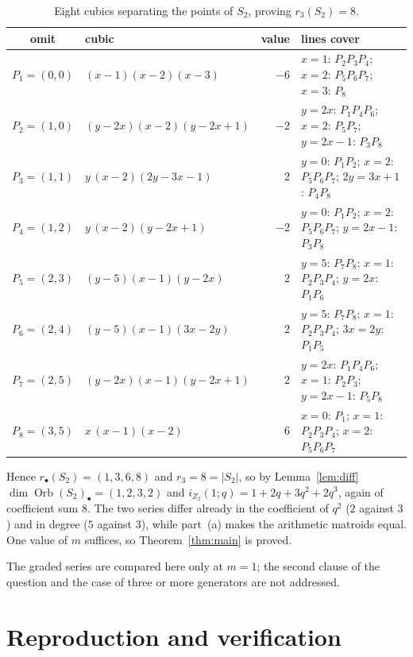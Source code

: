 \documentclass[11pt]{amsart}
\theoremstyle{definition}
\newcommand{\Orb}{\operatorname{Orb}}
\newcommand{\Ztwo}{Z_2}
\begin{document}
\begin{table}[htbp]
\small
\renewcommand{\arraystretch}{1.2}
\begin{tabular}{@{}clr>{\raggedright\arraybackslash}p{}@{}}
\hline
omit & cubic & value & lines cover\\
\hline
$P_1=(0,0)$ & $(x-1)(x-2)(x-3)$ & $-6$ & $x{=}1$: $P_2P_3P_4$; $x{=}2$: $P_5P_6P_7$; $x{=}3$: $P_8$\\
$P_2=(1,0)$ & $(y-2x)(x-2)(y-2x+1)$ & $-2$ & $y{=}2x$: $P_1P_4P_6$; $x{=}2$: $P_5P_7$; $y{=}2x{-}1$: $P_3P_8$\\
$P_3=(1,1)$ & $y\,(x-2)(2y-3x-1)$ & $2$ & $y{=}0$: $P_1P_2$; $x{=}2$: $P_5P_6P_7$; $2y{=}3x{+}1$: $P_4P_8$\\
$P_4=(1,2)$ & $y\,(x-2)(y-2x+1)$ & $-2$ & $y{=}0$: $P_1P_2$; $x{=}2$: $P_5P_6P_7$; $y{=}2x{-}1$: $P_3P_8$\\
$P_5=(2,3)$ & $(y-5)(x-1)(y-2x)$ & $2$ & $y{=}5$: $P_7P_8$; $x{=}1$: $P_2P_3P_4$; $y{=}2x$: $P_1P_6$\\
$P_6=(2,4)$ & $(y-5)(x-1)(3x-2y)$ & $2$ & $y{=}5$: $P_7P_8$; $x{=}1$: $P_2P_3P_4$; $3x{=}2y$: $P_1P_5$\\
$P_7=(2,5)$ & $(y-2x)(x-1)(y-2x+1)$ & $2$ & $y{=}2x$: $P_1P_4P_6$; $x{=}1$: $P_2P_3$; $y{=}2x{-}1$: $P_5P_8$\\
$P_8=(3,5)$ & $x\,(x-1)(x-2)$ & $6$ & $x{=}0$: $P_1$; $x{=}1$: $P_2P_3P_4$; $x{=}2$: $P_5P_6P_7$\\
\hline
\end{tabular}
\medskip
\caption{Eight cubics separating the points of $S_2$, proving $r_3(S_2)=8$.}
\label{tab:cubics}
\end{table}

Hence $r_\bullet(S_2)=(1,3,6,8)$ and $r_3=8=|S_2|$, so by Lemma~\ref{lem:diff}
$\dim\Orb(S_2)_\bullet=(1,2,3,2)$ and $i_{\Ztwo}(1;q)=1+2q+3q^2+2q^3$, again of coefficient sum
$8$. The two series differ already in the coefficient of $q^2$ ($2$ against $3$) and in degree
($5$ against $3$), while part~(a) makes the arithmetic matroids equal. One value of $m$ suffices,
so Theorem~\ref{thm:main} is proved.\hfill\qedsymbol

\medskip

\noindent The graded series are compared here only at $m=1$; the second clause of the question and
the case of three or more generators are not addressed.

\section{Reproduction and verification}\label{sec:verif}
\end{document}

